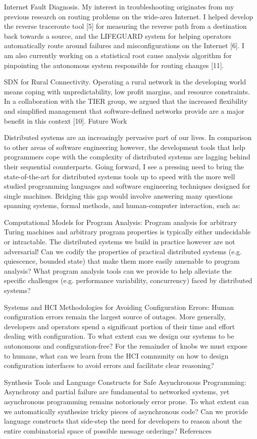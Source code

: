 Internet Fault Diagnosis. My interest in troubleshooting originates from my previous research on routing problems on the wide-area Internet. I helped develop the reverse traceroute tool [5] for measuring the reverse path from a destination back towards a source, and the LIFEGUARD system for helping operators automatically route around failures and misconfigurations on the Internet [6]. I am also currently working on a statistical root cause analysis algorithm for pinpointing the autonomous system responsible for routing changes [11].

SDN for Rural Connectivity. Operating a rural network in the developing world means coping with unpredictability, low profit margins, and resource constraints. In a collaboration with the TIER group, we argued that the increased flexibility and simplified management that software-defined networks provide are a major benefit in this context [10].
Future Work

Distributed systems are an increasingly pervasive part of our lives. In comparison to other areas of software engineering however, the development tools that help programmers cope with the complexity of distributed systems are lagging behind their sequential counterparts. Going forward, I see a pressing need to bring the state-of-the-art for distributed systems tools up to speed with the more well studied programming languages and software engineering techniques designed for single machines. Bridging this gap would involve answering many questions spanning systems, formal methods, and human-computer interaction, such as:

Computational Models for Program Analysis: Program analysis for arbitrary Turing machines and arbitrary program properties is typically either undecidable or intractable. The distributed systems we build in practice however are not adversarial! Can we codify the properties of practical distributed systems (e.g. quiescence, bounded state) that make them more easily amenable to program analysis? What program analysis tools can we provide to help alleviate the specific challenges (e.g. performance variability, concurrency) faced by distributed systems?

Systems and HCI Methodologies for Avoiding Configuration Errors: Human configuration errors remain the largest source of outages. More generally, developers and operators spend a significant portion of their time and effort dealing with configuration. To what extent can we design our systems to be autonomous and configuration-free? For the remainder of knobs we must expose to humans, what can we learn from the HCI community on how to design configuration interfaces to avoid errors and facilitate clear reasoning?

Synthesis Tools and Language Constructs for Safe Asynchronous Programming: Asynchrony and partial failure are fundamental to networked systems, yet asynchronous programming remains notoriously error prone. To what extent can we automatically synthesize tricky pieces of asynchronous code? Can we provide language constructs that side-step the need for developers to reason about the entire combinatorial space of possible message orderings?
References
